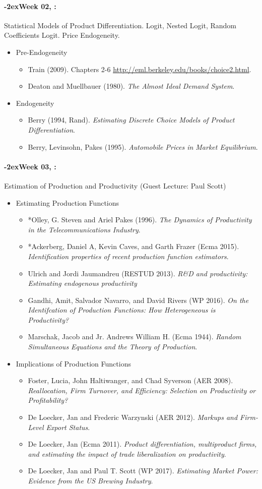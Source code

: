 \documentclass[11pt]{article}
\newcommand{\week}[1]{%
  \paragraph*{\kern-2ex\quad #1, \syldate{\today}:}%
  \ifdim\wd1=\wd\THURSDAY
    \AdvanceDate[7]
  \else
    \AdvanceDate[7]
  \fi%
}
\begin{document}
\week{Week 02} Statistical Models of Product Differentiation. Logit, Nested Logit, Random Coefficients Logit. Price Endogeneity.
\begin{itemize}
\item Pre-Endogeneity
\begin{itemize}
\item Train (2009). Chapters 2-6 \url{http://eml.berkeley.edu/books/choice2.html}.
\item Deaton and Muellbauer (1980). \textit{The Almost Ideal Demand System}.
\end{itemize}
\item Endogeneity
\begin{itemize}
\item Berry (1994, Rand). \textit{Estimating Discrete Choice Models of Product Differentiation}. 
\item Berry, Levinsohn, Pakes (1995). \textit{Automobile Prices in Market Equilibrium}.
\end{itemize}
\end{itemize}


\week{Week 03} Estimation of Production and Productivity (Guest Lecture: Paul Scott)
\begin{itemize}
\item Estimating Production Functions
\begin{itemize}
\item *Olley, G. Steven and Ariel Pakes (1996). \textit{The Dynamics of Productivity in the Telecommunications Industry}.
\item  *Ackerberg, Daniel A, Kevin Caves, and Garth Frazer (Ecma 2015). \textit{Identification properties of recent production function estimators}.
\item Ulrich and Jordi Jaumandreu (RESTUD 2013). \textit{R\&D and productivity: Estimating endogenous productivity}
\item Gandhi, Amit, Salvador Navarro, and David Rivers (WP 2016). \textit{On the Identifcation of Production Functions: How Heterogeneous is Productivity?}
\item Marschak, Jacob and Jr. Andrews William H. (Ecma 1944). \textit{Random Simultaneous Equations and the Theory of Production}.
\end{itemize}
\item Implications of Production Functions
\begin{itemize}
\item Foster, Lucia, John Haltiwanger, and Chad Syverson (AER 2008). \textit{Reallocation, Firm Turnover, and Efficiency: Selection on Productivity or Profitability?}
\item De Loecker, Jan and Frederic Warzynski (AER 2012). \textit{Markups and Firm-Level Export Status}.
\item De Loecker, Jan (Ecma 2011). \textit{Product differentiation, multiproduct firms, and estimating the impact of trade liberalization on productivity}.
\item De Loecker, Jan and Paul T. Scott (WP 2017). \textit{Estimating Market Power: Evidence from the US Brewing Industry}.
\end{itemize}
\end{itemize}
\end{document}
